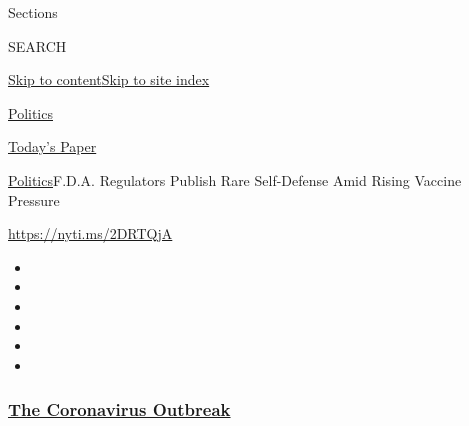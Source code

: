 Sections

SEARCH

\protect\hyperlink{site-content}{Skip to
content}\protect\hyperlink{site-index}{Skip to site index}

\href{https://www.nytimes3xbfgragh.onion/section/politics}{Politics}

\href{https://myaccount.nytimes3xbfgragh.onion/auth/login?response_type=cookie\&client_id=vi}{}

\href{https://www.nytimes3xbfgragh.onion/section/todayspaper}{Today's
Paper}

\href{/section/politics}{Politics}\textbar{}F.D.A. Regulators Publish
Rare Self-Defense Amid Rising Vaccine Pressure

\url{https://nyti.ms/2DRTQjA}

\begin{itemize}
\item
\item
\item
\item
\item
\item
\end{itemize}

\hypertarget{the-coronavirus-outbreak}{%
\subsubsection{\texorpdfstring{\href{https://www.nytimes3xbfgragh.onion/news-event/coronavirus?name=styln-coronavirus-national\&region=TOP_BANNER\&block=storyline_menu_recirc\&action=click\&pgtype=Article\&impression_id=8ae4c290-f52e-11ea-a27c-57a91b2bcc92\&variant=undefined}{The
Coronavirus
Outbreak}}{The Coronavirus Outbreak}}\label{the-coronavirus-outbreak}}

